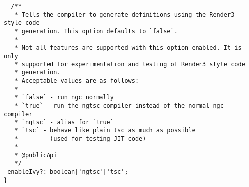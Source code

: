 \begin{verbatim}
  /**
   * Tells the compiler to generate definitions using the Render3 style code
   * generation. This option defaults to `false`.
   *
   * Not all features are supported with this option enabled. It is only
   * supported for experimentation and testing of Render3 style code
   * generation.
   * Acceptable values are as follows:
   *
   * `false` - run ngc normally
   * `true` - run the ngtsc compiler instead of the normal ngc compiler
   * `ngtsc` - alias for `true`
   * `tsc` - behave like plain tsc as much as possible
   *         (used for testing JIT code)
   *
   * @publicApi
   */
 enableIvy?: boolean|'ngtsc'|'tsc';
}
\end{verbatim}
